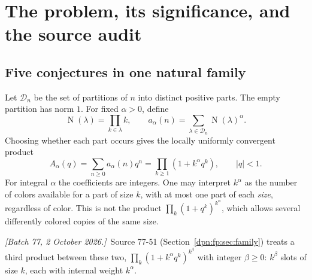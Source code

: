 \documentclass[11pt]{article}
\numberwithin{equation}{section}
\theoremstyle{definition}\newtheorem{definition}[theorem]{Definition}
\theoremstyle{remark}\newtheorem{remark}[theorem]{Remark}
\newcommand{\normp}{\operatorname{N}}
\newcommand{\OEIS}[1]{\href{https://oeis.org/#1}{\texttt{#1}}}
\newcommand{\writenotec}[1]{\par\smallskip\noindent\textit{[Batch 77, 2 October 2026.]}\ #1\par\smallskip}
\begin{document}
\begin{abstract}
A fifth manuscript, source 77-51 of batch 77, proves the core theorems once
more (recorded in one table) and adds the slot-multiplicity family
$\prod(1+k^\alpha q^k)^{k^\beta}$, $\beta\ge1$ an integer, with the
logarithmic equivalent conjectured for \OEIS{A266891}
(Section~\ref{dpn:fp:sec:b77}).

Three more manuscripts of one series, sources 100-82, 100-89 and 100-93 of
batch 100, follow (Sections~\ref{dpn:rb:sec:b100} and~\ref{dpn:ct:sec:theta}).
The first two prove the core theorems a sixth and a seventh time, with
identical coefficients, and add $P_9$, $P_{10}$, $\Delta_9$, $\Delta_{10}$, a
smooth lattice-minus-integral difference with explicit Taylor coefficients,
an all-orders relative expansion with the exact integral, and an all-orders
exact-range inverse.  The third treats powers growing like
$\alpha\asymp(2n)^{1/6}/\log n$: the Fourier resonances of
Section~\ref{dpn:sec:resonance} then enter the leading order, the coefficient
carries a Jacobi theta multiplier, and no single-Gaussian equivalent holds
uniformly.
\end{abstract}
\setcounter{tocdepth}{1}
\begingroup
\setlength{\parskip}{0pt}
\tableofcontents
\endgroup
\newpage

\section{The problem, its significance, and the source audit}
\subsection{Five conjectures in one natural family}
Let $\mathcal D_n$ be the set of partitions of $n$ into distinct positive parts.
The empty partition has norm $1$. For fixed $\alpha>0$, define
\begin{equation}\label{dpn:eq:def}
 \normp(\lambda)=\prod_{k\in\lambda}k,
 \qquad a_\alpha(n)=\sum_{\lambda\in\mathcal D_n}\normp(\lambda)^\alpha.
\end{equation}
Choosing whether each part occurs gives the locally uniformly convergent product
\begin{equation}\label{dpn:eq:product}
 A_\alpha(q)=\sum_{n\ge0}a_\alpha(n)q^n
 =\prod_{k\ge1}(1+k^\alpha q^k),\qquad |q|<1.
\end{equation}
For integral $\alpha$ the coefficients are integers. One may interpret $k^\alpha$
as the number of colors available for a part of size $k$, with at most one part
of each \emph{size}, regardless of color. This is not the product
$\prod_k(1+q^k)^{k^\alpha}$, which allows several differently colored copies of
the same size.
\writenotec{Source 77-51 (Section~\ref{dpn:fp:sec:family}) treats a third
product between these two, $\prod_k(1+k^\alpha q^k)^{k^\beta}$ with integer
$\beta\ge0$: $k^\beta$ slots of size $k$, each with internal weight
$k^\alpha$.}
\end{document}
